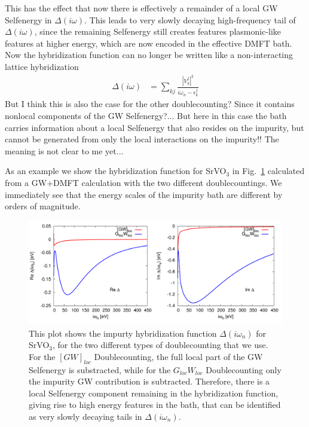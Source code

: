 \documentclass[12pt,a4paper]{scrartcl}
\numberwithin{equation}{section}
\begin{document}
\begin{itemize}
This has the effect that now there is effectively a remainder of a 
local GW Selfenergy in $\Delta(i\omega)$. This leads to very slowly
decaying high-frequency tail of $\Delta(i\omega)$, since the remaining
Selfenergy still creates features plasmonic-like features at higher energy,
which are now encoded in the effective DMFT bath.
Now the hybridization function can no longer 
be written like a non-interacting lattice hybridization
\begin{align}
\Delta(i\omega) &= \sum_{kj} \frac{|V^j_k|^2}{i\omega_n - \epsilon_k^j}
\end{align}
But I think this is also the case for the other doublecounting?
Since it contains nonlocal components of the GW Selfenergy?...
But here in this case the bath carries information about a local Selfenergy
that also resides on the impurity, but cannot be generated from only
the local interactions on the impurity!!
The meaning is not clear to me yet...

\bigskip

As an example we show the hybridization function for SrVO$_3$
in Fig.~\ref{fig:hybrid_comp_SVO} calculated from a GW+DMFT calculation
with the two different doublecountings.
We immediately see that the energy scales of the impurity bath
are different by orders of magnitude. 

\begin{figure}[h]
\begin{center}
\includegraphics[width=1\textwidth]{figs/SrVO3_hybrid_dc_comp.pdf} 
\end{center}
\caption{This plot shows the impurty hybridization function
$\Delta(i\omega_n)$ for SrVO$_3$, for the two different types
of doublecounting that we use. 
For the $[GW]_{loc}$ Doublecounting, the full local part of the GW
Selfenergy  is substracted, while for the $G_{loc}W_{loc}$ Doublecounting
only the impurity GW contribution is subtracted. Therefore, 
there is a local Selfenergy component remaining in the hybridization
function, giving rise to high energy features in the bath, that can 
be identified as very slowly decaying tails in $\Delta(i\omega_n)$.}
\label{fig:hybrid_comp_SVO}
\end{figure}

\end{itemize}
\end{document}
